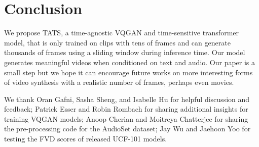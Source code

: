 \section{Conclusion}
We propose TATS, a time-agnostic VQGAN and time-sensitive transformer model, that is only trained on clips with tens of frames and can generate thousands of frames using a sliding window during inference time. Our model generates meaningful videos when conditioned on text and audio. Our paper is a small step but we hope it can encourage future works on more interesting forms of video synthesis with a realistic number of frames, perhaps even movies.

 We thank Oran Gafni, Sasha Sheng, and Isabelle Hu for helpful discussion and feedback; Patrick Esser and Robin Rombach for sharing additional insights for training VQGAN models; Anoop Cherian and Moitreya Chatterjee for sharing the pre-processing code for the AudioSet dataset; Jay Wu and Jaehoon Yoo for testing the FVD scores of released UCF-101 models.